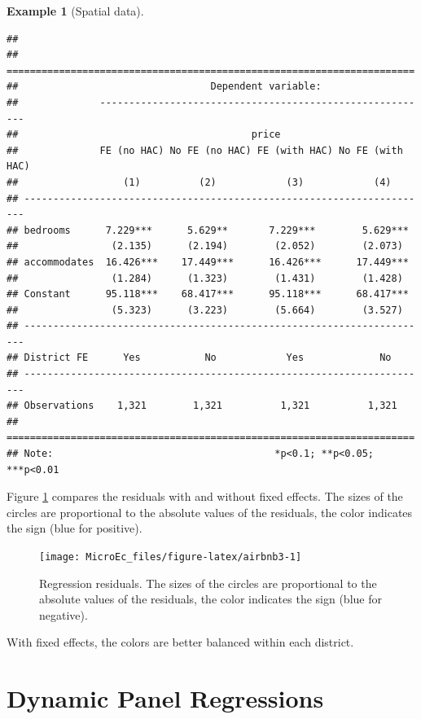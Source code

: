 \documentclass[
  12pt,
]{book}
\theoremstyle{definition}
\theoremstyle{definition}
\newtheorem{example}{Example}[chapter]
\theoremstyle{definition}
\theoremstyle{definition}
\theoremstyle{remark}
\begin{document}
\begin{example}[Spatial data]
\begin{verbatim}
## 
## ======================================================================
##                                 Dependent variable:                   
##              ---------------------------------------------------------
##                                        price                          
##              FE (no HAC) No FE (no HAC) FE (with HAC) No FE (with HAC)
##                  (1)          (2)            (3)            (4)       
## ----------------------------------------------------------------------
## bedrooms      7.229***      5.629**       7.229***        5.629***    
##                (2.135)      (2.194)        (2.052)        (2.073)     
## accommodates  16.426***    17.449***      16.426***      17.449***    
##                (1.284)      (1.323)        (1.431)        (1.428)     
## Constant      95.118***    68.417***      95.118***      68.417***    
##                (5.323)      (3.223)        (5.664)        (3.527)     
## ----------------------------------------------------------------------
## District FE      Yes           No            Yes             No       
## ----------------------------------------------------------------------
## Observations    1,321        1,321          1,321          1,321      
## ======================================================================
## Note:                                      *p<0.1; **p<0.05; ***p<0.01
\end{verbatim}

Figure \ref{fig:airbnb3} compares the residuals with and without fixed effects. The sizes of the circles are proportional to the absolute values of the residuals, the color indicates the sign (blue for positive).

\begin{figure}
\texttt{[image: MicroEc\_files/figure-latex/airbnb3-1]} \caption{Regression residuals. The sizes of the circles are proportional to the absolute values of the residuals, the color indicates the sign (blue for negative).}\label{fig:airbnb3}
\end{figure}

With fixed effects, the colors are better balanced within each district.
\end{example}

\hypertarget{DynPanel}{%
\section{Dynamic Panel Regressions}\label{DynPanel}}
\end{document}
